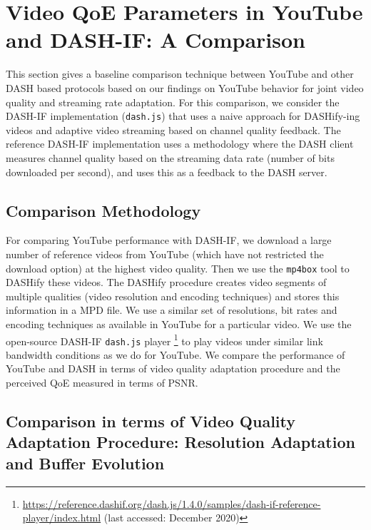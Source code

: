 \section{Video QoE Parameters in YouTube and DASH-IF: A Comparison}
\label{sec:open-dash}

This section gives a baseline comparison technique between YouTube and other DASH based protocols based on our findings on YouTube behavior for joint video quality and streaming rate adaptation. For this comparison, we consider the \ac{DASH-IF} implementation (\texttt{dash.js}) that uses a naive approach for DASHify-ing videos and adaptive video streaming based on channel quality feedback. The reference \ac{DASH-IF} implementation uses a methodology where the \ac{DASH} client measures channel quality based on the streaming data rate (number of bits downloaded per second), and uses this as a feedback to the \ac{DASH} server.

\subsection{Comparison Methodology}

For comparing YouTube performance with \ac{DASH-IF}, we download a large number of reference videos from YouTube (which have not restricted the download option) at the highest video quality. Then we use the \texttt{mp4box} tool to DASHify these videos. The DASHify procedure creates video segments of multiple qualities (video resolution and encoding techniques) and stores this information in a \ac{MPD} file. We use a similar set of resolutions, bit rates and encoding techniques as available in YouTube for a particular video. We use the open-source \ac{DASH-IF} \texttt{dash.js} player \footnote{\url{https://reference.dashif.org/dash.js/1.4.0/samples/dash-if-reference-player/index.html} (last accessed: December 2020)} to play videos under similar link bandwidth conditions as we do for YouTube. We compare the performance of YouTube and \ac{DASH} in terms of video quality adaptation procedure and the perceived \ac{QoE} measured in terms of \ac{PSNR}.

\subsection{Comparison in terms of Video Quality Adaptation Procedure: Resolution Adaptation and Buffer Evolution}

